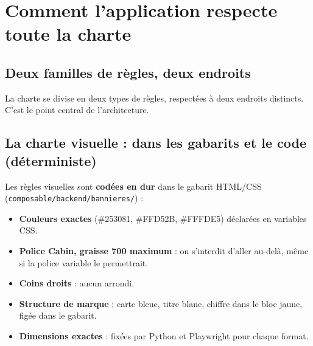\documentclass[11pt,a4paper]{article}
\begin{document}
\section{Comment l'application respecte toute la charte}

\subsection{Deux familles de règles, deux endroits}
La charte se divise en deux types de règles, respectées à deux endroits
distincts. C'est le point central de l'architecture.

\subsection{La charte visuelle : dans les gabarits et le code (déterministe)}
Les règles visuelles sont \textbf{codées en dur} dans le gabarit HTML/CSS
(\texttt{composable/backend/bannieres/}) :
\begin{itemize}[leftmargin=1.4em]
  \item \textbf{Couleurs exactes} (\#253081, \#FFD52B, \#FFFDE5) déclarées en
        variables CSS.
  \item \textbf{Police Cabin, graisse 700 maximum} : on s'interdit d'aller
        au-delà, même si la police variable le permettrait.
  \item \textbf{Coins droits} : aucun arrondi.
  \item \textbf{Structure de marque} : carte bleue, titre blanc, chiffre dans le
        bloc jaune, figée dans le gabarit.
  \item \textbf{Dimensions exactes} : fixées par Python et Playwright pour chaque
        format.
\end{itemize}
\end{document}
